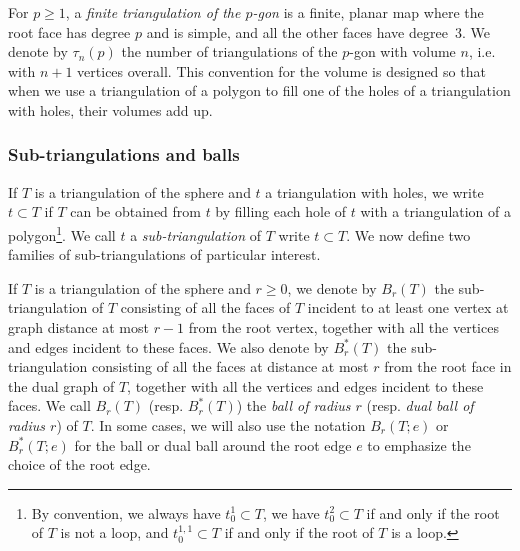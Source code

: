 \documentclass[AHL,Unicode,longabstracts,published]{cedram}
\begin{document}
For $p \geq 1$, a \emph{finite triangulation of the $p$-gon} is a finite, planar map where the root face has degree $p$ and is simple, and all the other faces have degree~$3$. We denote by $\tau_n(p)$ the number of triangulations of the $p$-gon with volume $n$, i.e. with $n+1$ vertices overall. This convention for the volume is designed so that when we use a triangulation of a polygon to fill one of the holes of a triangulation with holes, their volumes add up.


\subsubsection*{Sub-triangulations and balls}
If $T$ is a triangulation of the sphere and $t$ a triangulation with holes, we write $t \subset T$ if $T$ can be obtained from $t$ by filling each hole of $t$ with a triangulation of a polygon\footnote{By convention, we always have $t^1_0 \subset T$, we have $t^2_0 \subset T$ if and only if the root of $T$ is not a loop, and $t^{1,1}_0 \subset T$ if and only if the root of $T$ is a loop.}. We call $t$ a \emph{sub-triangulation} of $T$ write $t \subset T$. We now define two families of sub-triangulations of particular interest.

If $T$ is a triangulation of the sphere and $r \geq 0$, we denote by $B_r(T)$ the sub-triangulation of $T$ consisting of all the faces of $T$ incident to at least one vertex at graph distance at most $r-1$ from the root vertex, together with all the vertices and edges incident to these faces. We also denote by $B_r^*(T)$ the sub-triangulation consisting of all the faces at distance at most $r$ from the root face in the dual graph of $T$, together with all the vertices and edges incident to these faces. We call $B_r(T)$ (resp. $B_r^*(T)$) the \emph{ball of radius $r$} (resp. \emph{dual ball of radius $r$}) of $T$. In some cases, we will also use the notation $B_r(T;e)$ or $B_r^*(T;e)$ for the ball or dual ball around the root edge $e$ to emphasize the choice of the root edge.
\end{document}
